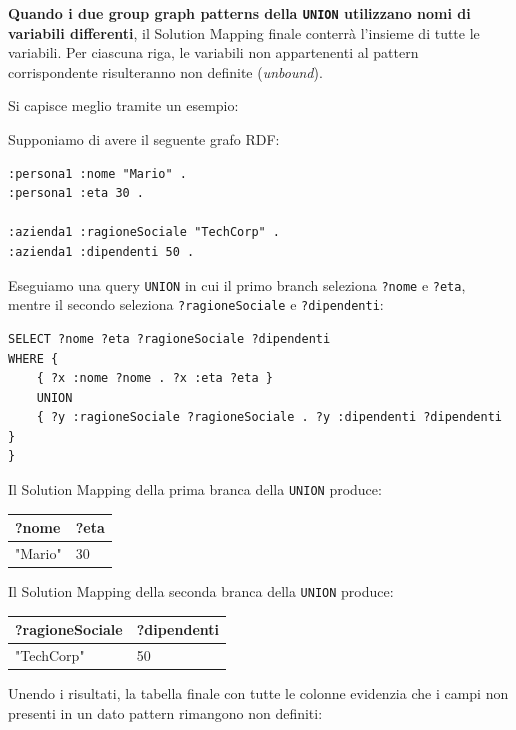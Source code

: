 \textbf{Quando i due group graph patterns della \texttt{UNION} utilizzano nomi di variabili differenti}, il Solution Mapping finale conterrà l'insieme di tutte le variabili. Per ciascuna riga, le variabili non appartenenti al pattern corrispondente risulteranno non definite (\textit{unbound}).

Si capisce meglio tramite un esempio:

Supponiamo di avere il seguente grafo RDF:

\begin{verbatim}
:persona1 :nome "Mario" .
:persona1 :eta 30 .

:azienda1 :ragioneSociale "TechCorp" .
:azienda1 :dipendenti 50 .
\end{verbatim}

Eseguiamo una query \texttt{UNION} in cui il primo branch seleziona \texttt{?nome} e \texttt{?eta}, mentre il secondo seleziona \texttt{?ragioneSociale} e \texttt{?dipendenti}:

\begin{verbatim}
SELECT ?nome ?eta ?ragioneSociale ?dipendenti
WHERE {
    { ?x :nome ?nome . ?x :eta ?eta }
    UNION
    { ?y :ragioneSociale ?ragioneSociale . ?y :dipendenti ?dipendenti }
}
\end{verbatim}

Il Solution Mapping della prima branca della \texttt{UNION} produce:
\begin{table}[h!]
\centering
\begin{tabular}{|l|l|}
\hline
\textbf{?nome} & \textbf{?eta} \\ \hline
"Mario" & 30 \\ \hline
\end{tabular}
\end{table}

\newpage

Il Solution Mapping della seconda branca della \texttt{UNION} produce:
\begin{table}[h!]
\centering
\begin{tabular}{|l|l|}
\hline
\textbf{?ragioneSociale} & \textbf{?dipendenti} \\ \hline
"TechCorp" & 50 \\ \hline
\end{tabular}
\end{table}

Unendo i risultati, la tabella finale con tutte le colonne evidenzia che i campi non presenti in un dato pattern rimangono non definiti:

